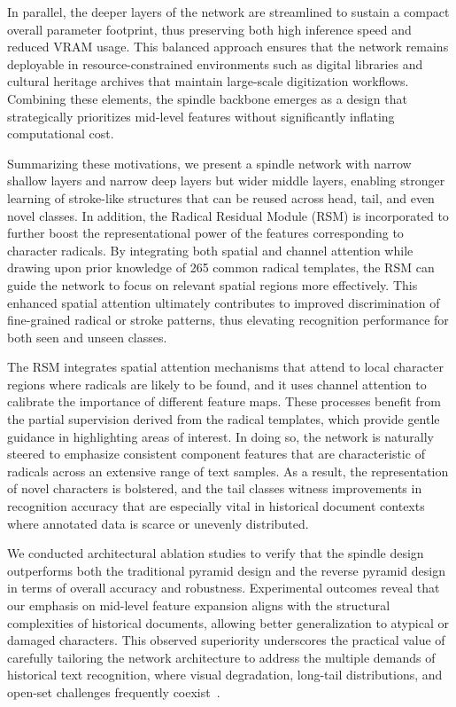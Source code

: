 In parallel, the deeper layers of the network are streamlined to sustain a compact overall parameter footprint, thus preserving both high inference speed and reduced VRAM usage. This balanced approach ensures that the network remains deployable in resource-constrained environments such as digital libraries and cultural heritage archives that maintain large-scale digitization workflows. Combining these elements, the spindle backbone emerges as a design that strategically prioritizes mid-level features without significantly inflating computational cost.

Summarizing these motivations, we present a spindle network with narrow shallow layers and narrow deep layers but wider middle layers, enabling stronger learning of stroke-like structures that can be reused across head, tail, and even novel classes. In addition, the Radical Residual Module (RSM) is incorporated to further boost the representational power of the features corresponding to character radicals. By integrating both spatial and channel attention while drawing upon prior knowledge of 265 common radical templates, the RSM can guide the network to focus on relevant spatial regions more effectively. This enhanced spatial attention ultimately contributes to improved discrimination of fine-grained radical or stroke patterns, thus elevating recognition performance for both seen and unseen classes.

The RSM integrates spatial attention mechanisms that attend to local character regions where radicals are likely to be found, and it uses channel attention to calibrate the importance of different feature maps. These processes benefit from the partial supervision derived from the radical templates, which provide gentle guidance in highlighting areas of interest. In doing so, the network is naturally steered to emphasize consistent component features that are characteristic of radicals across an extensive range of text samples. As a result, the representation of novel characters is bolstered, and the tail classes witness improvements in recognition accuracy that are especially vital in historical document contexts where annotated data is scarce or unevenly distributed.

We conducted architectural ablation studies to verify that the spindle design outperforms both the traditional pyramid design and the reverse pyramid design in terms of overall accuracy and robustness. Experimental outcomes reveal that our emphasis on mid-level feature expansion aligns with the structural complexities of historical documents, allowing better generalization to atypical or damaged characters. This observed superiority underscores the practical value of carefully tailoring the network architecture to address the multiple demands of historical text recognition, where visual degradation, long-tail distributions, and open-set challenges frequently coexist~\cite{Bai2023}.

